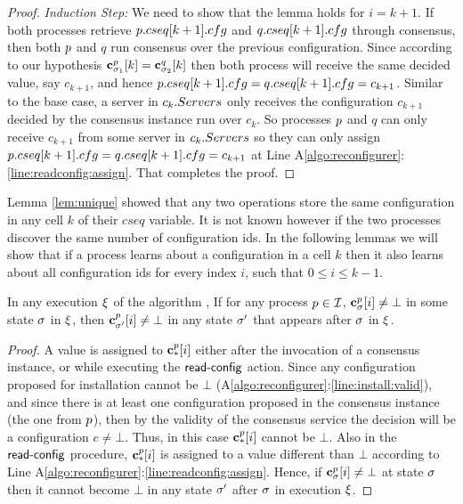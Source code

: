 \begin{proof}
	\emph{Induction Step:}  We need to show that the lemma holds for $i=k+1$.
	If both processes retrieve $p.cseq[k+1].cfg$ and $q.cseq[k+1].cfg$ through consensus, 
	then both $p$ and $q$ run consensus
	over the previous configuration. Since according to our hypothesis 
	$\mathbf{c}^{p}_{\sigma_1}[k]=\mathbf{c}^{q}_{\sigma_2}[k]$ then both process will receive the same
	decided value, say $c_{k+1}$, and hence $p.cseq[k+1].cfg=q.cseq[k+1].cfg=c_{k+1}$. Similar to the base case,
	a server in $c_k.Servers$ only receives the configuration $c_{k+1}$ decided by the consensus instance run over $c_k$. 
	So processes 
	$p$ and $q$ can only receive $c_{k+1}$ from some server in $c_k.Servers$ 
	so they can only assign $p.cseq[k+1].cfg=q.cseq[k+1].cfg=c_{k+1}$ at Line A\ref{algo:reconfigurer}:\ref{line:readconfig:assign}.
	That completes the proof. 
\end{proof}


Lemma \ref{lem:unique} showed that any two operations store the same
configuration in any cell $k$ of their $cseq$ variable. It is not known however 
if the two processes discover the same number of configuration ids. In the following
lemmas we will show that if a process learns about a configuration in a cell $k$ 
then it also learns about all configuration ids for every index $i$, such that $0\leq i\leq k-1$.

\begin{lemma}
\label{lem:confmonotonic}
	In any execution $\EX$ of the algorithm , If for any process $p\in\mathcal{I}$, $\mathbf{c}^{p}_{\sigma}[i]\neq\bot$ in some state $\sigma$ in $\EX$,
	then $\mathbf{c}^{p}_{\sigma'}[i]\neq\bot$ in any state $\sigma'$ that appears after $\sigma$ in $\EX$. 
\end{lemma}

\begin{proof}
	A value is assigned to $\mathbf{c}^{p}_{*}[i]$ either after the invocation of a consensus instance, or while executing
	the $\act{read-config}$ action. Since any configuration proposed for installation cannot be $\bot$ (A\ref{algo:reconfigurer}:\ref{line:install:valid}), 
	and since there is at least one configuration proposed in the consensus instance (the one from $p$), then by the validity of the consensus
	service the decision will be a configuration $c\neq\bot$. Thus, in this case $\mathbf{c}^{p}_{*}[i]$ cannot be $\bot$.
	Also in the $\act{read-config}$ procedure, $\mathbf{c}^{p}_{*}[i]$ is assigned to a value different than $\bot$ according
	to Line A\ref{algo:reconfigurer}:\ref{line:readconfig:assign}. Hence, if $\mathbf{c}^{p}_{\sigma}[i]\neq\bot$ at state $\sigma$ 
	then it cannot become $\bot$ in any state $\sigma'$ after $\sigma$ in execution $\EX$.
\end{proof}



